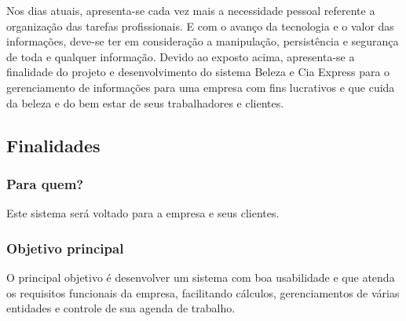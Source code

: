 Nos dias atuais, apresenta-se cada vez mais a necessidade pessoal referente a organização das tarefas profissionais. 
E com o avanço da tecnologia e o valor das informações, deve-se ter em consideração a manipulação, persistência e segurança de toda e qualquer informação.
Devido ao exposto acima, apresenta-se a finalidade do projeto e desenvolvimento do sistema Beleza e Cia Express para o gerenciamento de informações para uma empresa com fins lucrativos e que cuida da beleza e do bem estar de seus trabalhadores e clientes.

\subsection{Finalidades}
\subsubsection{Para quem?}
Este sistema será voltado para a empresa e seus clientes.
\subsubsection{Objetivo principal}
O principal objetivo é desenvolver um sistema com boa usabilidade e que atenda os requisitos funcionais da empresa, facilitando cálculos, gerenciamentos de várias entidades e controle de sua agenda de trabalho.